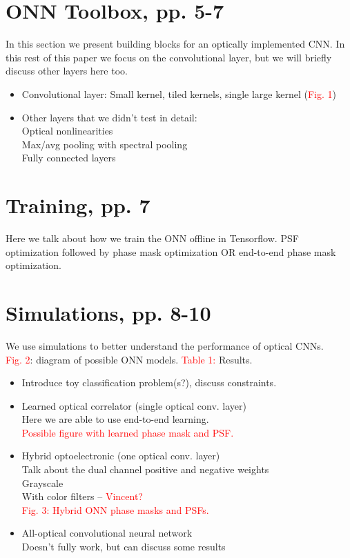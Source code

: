 \documentclass[runningheads]{llncs}
\newcommand{\red}[1]{\textcolor{red}{#1}}
\begin{document}
\section{ONN Toolbox, pp. 5-7}
\label{sec:toolbox}
In this section we present building blocks for an optically implemented CNN. In this rest of this paper we focus on the convolutional layer, but we will briefly discuss other layers here too.
\begin{itemize}
\item Convolutional layer:
	Small kernel, tiled kernels, single large kernel (\red{Fig. 1})
\item Other layers that we didn’t test in detail: \\
Optical nonlinearities \\ 
	Max/avg pooling with spectral pooling \\ 
	Fully connected layers	
\end{itemize}

\section{Training, pp. 7}
Here we talk about how we train the ONN offline in Tensorflow. PSF optimization followed by phase mask optimization OR end-to-end phase mask optimization.

\section{Simulations, pp. 8-10}
\label{sec:simulation}
We use simulations to better understand the performance of optical CNNs. \\
\red{Fig. 2}: diagram of possible ONN models.
\red{Table 1:} Results.
\begin{itemize}
\item Introduce toy classification problem(s?), discuss constraints.
\item Learned optical correlator (single optical conv. layer) \\ Here we are able to use end-to-end learning. \\
\red{Possible figure with learned phase mask and PSF.}
\item Hybrid optoelectronic (one optical conv. layer)\\ 
	Talk about the dual channel positive and negative weights\\
	Grayscale \\
	With color filters – \red{Vincent?}\\
\red{Fig. 3: Hybrid ONN phase masks and PSFs.}
\item All-optical convolutional neural network \\
Doesn’t fully work, but can discuss some results
\end{itemize}
\end{document}
